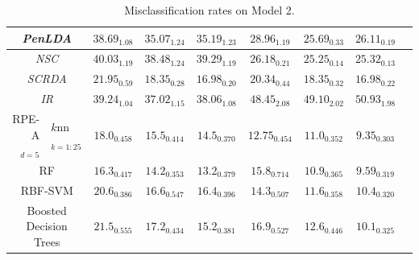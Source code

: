 \documentclass{amsart}
\providecommand{\tabularnewline}{\\}
\begin{document}
\begin{table}[p]
\begin{centering}
\begin{tabular}{r|l|c|c|c|c|c|c|c}
			\multicolumn{2}{c|}{\emph{PenLDA}} & $\mathit{38.69_{1.08}}$ & $\mathit{35.07_{1.24}}$ & $\mathit{35.19_{1.23}}$ & $\mathit{28.96_{1.19}}$ & $\mathit{25.69_{0.33}}$ & $\mathit{26.11_{0.19}}$ & \tabularnewline
			\hline 
			\multicolumn{2}{c|}{\emph{NSC}} & $\mathit{40.03_{1.19}}$ & $\mathit{38.48_{1.24}}$ & $\mathit{39.29_{1.19}}$ & $\mathit{26.18_{0.21}}$ & $\mathit{25.25_{0.14}}$ & $\mathit{25.32_{0.13}}$ & \tabularnewline
			\hline 
			\multicolumn{2}{c|}{\emph{SCRDA}} & $\mathit{21.95_{0.59}}$ & $\mathit{18.35_{0.28}}$ & $\mathit{16.98_{0.20}}$ & $\mathit{20.34_{0.44}}$ & $\mathit{18.35_{0.32}}$ & $\mathit{16.98_{0.22}}$ & \tabularnewline
			\hline 
			\multicolumn{2}{c|}{\emph{IR}} & $\mathit{39.24_{1.04}}$ & $\mathit{37.02_{1.15}}$ & $\mathit{38.06_{1.08}}$ & $\mathit{48.45_{2.08}}$ & $\mathit{49.10_{2.02}}$ & $\mathit{50.93_{1.98}}$ & \tabularnewline
			\hline 
			\hline 
			RPE-A$_{d=5}$ & $k$nn$_{k=1:25}$ & $18.0_{0.458}$ & $15.5_{0.414}$ & $14.5_{0.370}$ & $12.75_{0.454}$ & $11.0_{0.352}$ & $9.35_{0.303}$ & \tabularnewline
			\hline 
			\hline 
			\multicolumn{2}{c|}{RF} & $\mathbf{16.3_{0.417}}$ & $\mathbf{14.2_{0.353}}$ & $\mathbf{13.2_{0.379}}$ & $15.8_{0.714}$ & $10.9_{0.365}$ & $9.59_{0.319}$ & \tabularnewline
			\hline 
			\multicolumn{2}{c|}{RBF-SVM} & $20.6_{0.386}$ & $16.6_{0.547}$ & $16.4_{0.396}$ & $14.3_{0.507}$ & $11.6_{0.358}$ & $10.4_{0.320}$ & \tabularnewline
			\hline 
			\multicolumn{2}{c|}{Boosted Decision Trees} & $21.5_{0.555}$ & $17.2_{0.434}$ & $15.2_{0.381}$ & $16.9_{0.527}$ & $12.6_{0.446}$ & $10.1_{0.325}$ & \tabularnewline
		\end{tabular}\\
		
		\par\end{centering}
	
	\protect\caption{Misclassification rates on Model 2.}
	\label{tab:model-2}
\end{table}
\end{document}
